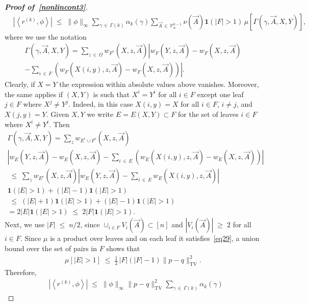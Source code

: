 \documentclass[10pt,a4paper]{article}
\renewcommand{\leq}{\;\leqslant\;}
\renewcommand{\geq}{\;\geqslant\;}
\newcommand{\tv}{\mathrm{TV}}
\newcommand{\ind}{\mathbf{1}}
\newcommand{\cV}{\mathcal{V}}
\let\g=\gamma
\let\G=\Gamma
\let\O=\Omega
\begin{document}
\begin{proof}[{\bf Proof of~\eqref{nonlincont3}}]
\begin{align}\label{eq2a85}
& \left|\left\langle r^{(k)},\phi\right\rangle\right|\leq \|\phi\|_\infty\sum_{\gamma\,\in\,\Gamma(k)}\alpha_k(\gamma)
\sum_{\vec A\,\in\,\cV_n^{k-1}} \nu(\vec A)\ind(|F|>1)
\,\mu\left[\G\left(\g,\vec A,X,Y\right)\right],
\end{align}
where we use the notation
\begin{multline}
\G\left(\g,\vec A,X,Y\right)
= \sum_{z\,\in\,\O} w_{F^c} \left(X,z,\vec A\right)\left|w_F \left(Y,z,\vec A\right)-w_F \left(X,z,\vec A\right)\right. \\
\left. -\sum_{i\,\in\,F}
\left(w_{F}\left(X(i,y),z,\vec A\right) - w_{F}\left(X,z,\vec A\right)
\right)\right|.
\end{multline}
Clearly, if $X=Y$ the expression within absolute values above vanishes. Moreover, the same applies if $(X,Y)$ is such that $X^i=Y^i$ for all $i\in F$ except one leaf $j\in F$ where $X^j\neq Y^j$. Indeed, in this case $X(i,y)=X$ for all $i\in F$, $i\neq j$, and $X(j,y)=Y$. Given $X,Y$ we write $E=E(X,Y)\subset F$ for the set of leaves $i\in F$ where $X^i\neq Y^i$. Then
\begin{multline}\label{abbao}
\G\left(\g,\vec A,X,Y\right)=\sum_z w_{E^c\cup F^c} \left(X,z,\vec A\right)\\
\left|w_E \left(Y,z,\vec A\right)-w_E \left(X,z,\vec A\right)-\sum_{i\,\in\,E}
\left(w_{E}\left(X(i,y),z,\vec A\right) - w_{E}\left(X,z,\vec A\right)\right)\right|\\
 \leq \sum_z w_{E^c} \left(X,z,\vec A\right)\left|w_E \left(Y,z,\vec A\right)-\sum_{i\,\in\,E} w_{E}\left(X(i,y),z,\vec A\right)\right|\\
\ind(|E|>1)+ (|E|-1)\ind(|E|>1)\\
\leq (|E|+1)\ind(|E|>1)+ (|E|-1)\ind(|E|>1) 
\\ = 2|E|\ind(|E|>1) \leq 2|F|\ind(|E|>1).
\end{multline}
Next, we use $|F|\leq n/2$, since $\cup_{i\in F}V_i(\vec A)\subset [n]$ and $|V_i(\vec A)|\geq 2$ for all $i\in F$. Since $\mu$ is a product over leaves and on each leaf it satisfies~\eqref{eq29}, a union bound over the set of pairs in $F$ shows that
\begin{align}\label{eqa128}
\mu\left[|E|>1\right]\leq \tfrac12\,|F|(|F|-1)\|p-q\|_{\tv}^2.
\end{align}
Therefore,
\begin{align}\label{eq2a86}
& \left|\left\langle r^{(k)},\phi\right\rangle\right|\leq \|\phi\|_\infty \|p-q\|_{\tv}^2\sum_{\gamma\,\in\,\Gamma(k)}\alpha_k(\gamma)

\end{align}
\end{proof}
\end{document}
